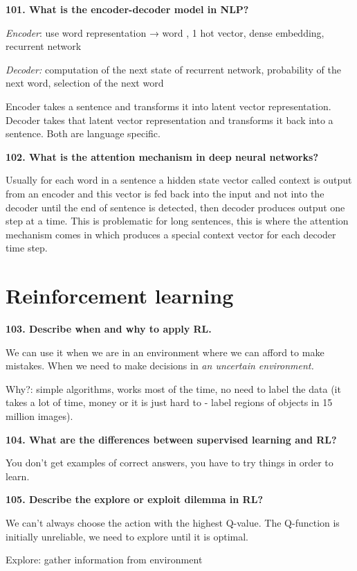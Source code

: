 \textbf{101. What is the encoder-decoder model in NLP?}

\textit{Encoder}: use word representation → word , 1 hot vector,
dense embedding, recurrent network

\textit{Decoder:} computation of the next state of recurrent network,
probability of the next word, selection of the next word

Encoder takes a sentence and transforms it into latent vector
representation. Decoder takes that latent vector representation and
transforms it back into a sentence. Both are language specific.


\textbf{102. What is the attention mechanism in deep neural networks?}

Usually for each word in a sentence a hidden state vector called context
is output from an encoder and this vector is fed back into the input and
not into the decoder until the end of sentence is detected, then decoder
produces output one step at a time. This is problematic for long
sentences, this is where the attention mechanism comes in which produces
a special context vector for each decoder time step.

\section{Reinforcement learning}

\textbf{103. Describe when and why to apply RL.}

We can use it when we are in an environment where we can afford to make
mistakes. When we need to make decisions in \textit{an uncertain
environment.}

Why?: simple algorithms, works most of the time, no need to label the
data (it takes a lot of time, money or it is just hard to - label
regions of objects in 15 million images).

\textbf{104. What are the differences between supervised learning and
RL?}

You don't get examples of correct answers, you have to try things in
order to learn.

\textbf{105. Describe the explore or exploit dilemma in RL?}

We can't always choose the action with the highest Q-value. The
Q-function is initially unreliable, we need to explore until it is
optimal.

Explore: gather information from environment


